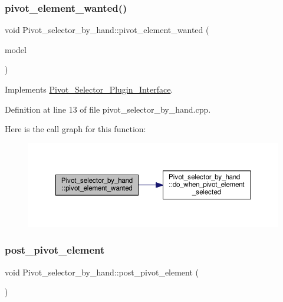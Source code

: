 \subsubsection{\texorpdfstring{pivot\+\_\+element\+\_\+wanted()}{pivot\_element\_wanted()}}
{\footnotesize\ttfamily void Pivot\+\_\+selector\+\_\+by\+\_\+hand\+::pivot\+\_\+element\+\_\+wanted (\begin{DoxyParamCaption}\item[{Q\+Standard\+Item\+Model $\ast$}]{model }\end{DoxyParamCaption})\hspace{0.3cm}{\ttfamily [virtual]}}



Implements \hyperlink{classPivot__Selector__Plugin__Interface_a79edca6930746a137a95a26239f7af5e}{Pivot\+\_\+\+Selector\+\_\+\+Plugin\+\_\+\+Interface}.



Definition at line 13 of file pivot\+\_\+selector\+\_\+by\+\_\+hand.\+cpp.

Here is the call graph for this function\+:\nopagebreak
\begin{figure}[H]
\begin{center}
\leavevmode
\includegraphics[width=350pt]{classPivot__selector__by__hand_adbb9dac36bf6cc6807433c617c19ad32_cgraph}
\end{center}
\end{figure}
\mbox{\label{classPivot__selector__by__hand_a4ea3619df38bf9d93fc0d263d4b12cdc}} 
\subsubsection{\texorpdfstring{post\+\_\+pivot\+\_\+element}{post\_pivot\_element}}
{\footnotesize\ttfamily void Pivot\+\_\+selector\+\_\+by\+\_\+hand\+::post\+\_\+pivot\+\_\+element (\begin{DoxyParamCaption}\item[{Q\+Model\+Index}]{ }\end{DoxyParamCaption})\hspace{0.3cm}{\ttfamily [signal]}}

